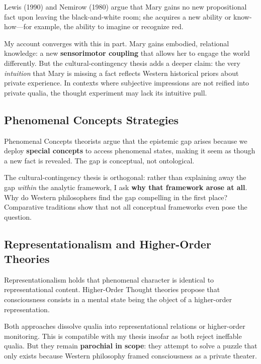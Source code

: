 \documentclass[11pt,a4paper]{article}
\begin{document}
Lewis (1990) and Nemirow (1980) argue that Mary gains no new propositional fact upon leaving the black-and-white room; she acquires a new ability or know-how—for example, the ability to imagine or recognize red.

My account converges with this in part. Mary gains embodied, relational knowledge: a new \textbf{sensorimotor coupling} that allows her to engage the world differently. But the cultural-contingency thesis adds a deeper claim: the very \emph{intuition} that Mary is missing a fact reflects Western historical priors about private experience. In contexts where subjective impressions are not reified into private qualia, the thought experiment may lack its intuitive pull.

\subsection{Phenomenal Concepts Strategies}

Phenomenal Concepts theorists \cite{loar1990, levine2001, papineau2002} argue that the epistemic gap arises because we deploy \textbf{special concepts} to access phenomenal states, making it seem as though a new fact is revealed. The gap is conceptual, not ontological.

The cultural-contingency thesis is orthogonal: rather than explaining away the gap \emph{within} the analytic framework, I ask \textbf{why that framework arose at all}. Why do Western philosophers find the gap compelling in the first place? Comparative traditions show that not all conceptual frameworks even pose the question.

\subsection{Representationalism and Higher-Order Theories}

Representationalism \cite{tye1995, dretske1995} holds that phenomenal character is identical to representational content. Higher-Order Thought theories \cite{rosenthal2005, lau2011} propose that consciousness consists in a mental state being the object of a higher-order representation.

Both approaches dissolve qualia into representational relations or higher-order monitoring. This is compatible with my thesis insofar as both reject ineffable qualia. But they remain \textbf{parochial in scope}: they attempt to solve a puzzle that only exists because Western philosophy framed consciousness as a private theater.
\end{document}
